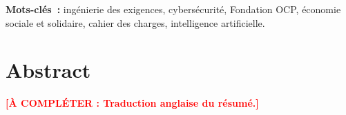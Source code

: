 \documentclass[a4paper,12pt]{report}
\newcommand{\TODO}[1]{\textcolor{red}{\textbf{[À COMPLÉTER : #1]}}}
\begin{document}
\textbf{Mots-clés~:} ingénierie des exigences, cybersécurité, Fondation OCP, économie
sociale et solidaire, cahier des charges, intelligence artificielle.

\chapter*{Abstract}
\TODO{Traduction anglaise du résumé.}

\tableofcontents
\listoffigures
\listoftables

\clearpage
{}












\appendix




\end{document}
